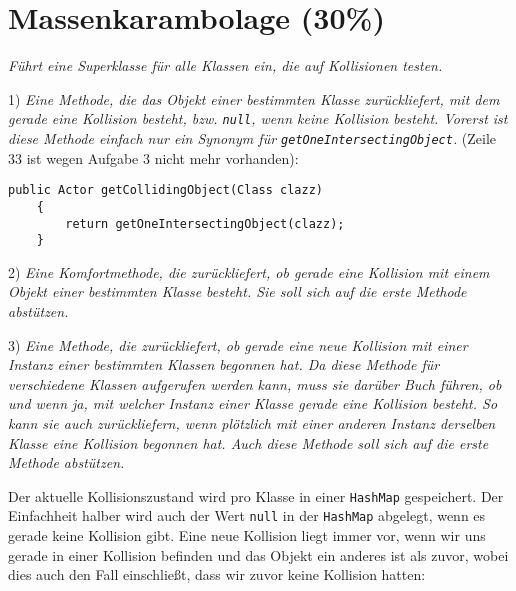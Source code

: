 \documentclass{../pi1-musterloesung}
\begin{document}
\section{Massenkarambolage (30\%)}
\label{s:collider}

\emph{Führt eine Superklasse für alle Klassen ein, die auf Kollisionen testen.}




1) \emph{Eine Methode, die das Objekt einer bestimmten Klasse zurückliefert, mit dem gerade eine Kollision besteht, bzw. \texttt{null}, wenn keine Kollision besteht. Vorerst ist diese Methode einfach nur ein Synonym für \texttt{getOneIntersectingObject}.} (Zeile 33 ist wegen Aufgabe 3 nicht mehr vorhanden):

\begin{lstlisting}[firstnumber=31]
    public Actor getCollidingObject(Class clazz)
    {
        return getOneIntersectingObject(clazz);
    }
\end{lstlisting}

2) \emph{Eine Komfortmethode, die zurückliefert, \emph{ob} gerade eine Kollision mit einem Objekt einer bestimmten Klasse besteht. Sie soll sich auf die erste Methode abstützen.}



3) \emph{Eine Methode, die zurückliefert, ob gerade eine neue Kollision mit einer Instanz einer bestimmten Klassen begonnen hat. Da diese Methode für verschiedene Klassen aufgerufen werden kann, muss sie darüber Buch führen, ob und wenn ja, mit welcher Instanz einer Klasse gerade eine Kollision besteht. So kann sie auch zurückliefern, wenn plötzlich mit einer anderen Instanz derselben Klasse eine Kollision begonnen hat. Auch diese Methode soll sich auf die erste Methode abstützen.}

Der aktuelle Kollisionszustand wird pro Klasse in einer \texttt{HashMap} gespeichert. Der Einfachheit halber wird auch der Wert \texttt{null} in der \texttt{HashMap} abgelegt, wenn es gerade keine Kollision gibt. Eine neue Kollision liegt immer vor, wenn wir uns gerade in einer Kollision befinden und das Objekt ein anderes ist als zuvor, wobei dies auch den Fall einschließt, dass wir zuvor keine Kollision hatten:



\end{document}
